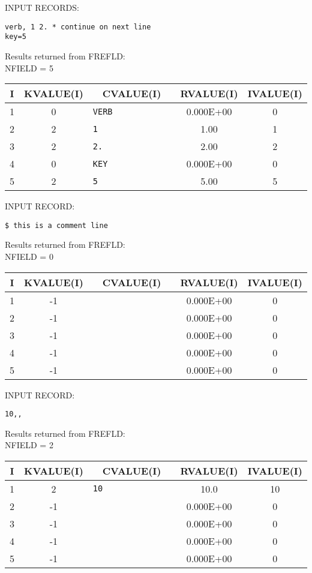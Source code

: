 INPUT RECORDS:\\
\begin{verbatim}
verb, 1 2. * continue on next line
key=5
\end{verbatim}

Results returned from FREFLD:\\
NFIELD = 5

\begin{tabular}{|ccccc|} \hline \hline
I    &  KVALUE(I) &       CVALUE(I)  &        RVALUE(I)   &  IVALUE(I)\\\hline
   1   &      0 &\verb*"VERB            " & 0.000E+00 & 0\\
   2   &      2 &\verb*"1               " & 1.00     & 1\\
   3   &      2 &\verb*"2.              " & 2.00     & 2\\
   4   &      0 &\verb*"KEY             " & 0.000E+00 & 0\\
   5   &      2 &\verb*"5               " & 5.00     & 5\\ \hline \hline
\end{tabular}

INPUT RECORD:
\begin{verbatim}
$ this is a comment line
\end{verbatim}

Results returned from FREFLD:\\
NFIELD = 0

\begin{tabular}{|ccccc|} \hline \hline
I    &  KVALUE(I)  &      CVALUE(I)    &     RVALUE(I) &    IVALUE(I)\\\hline
1 &-1 &\verb*"                "  &    0.000E+00 & 0\\
2 &-1 &\verb*"                "  &    0.000E+00 & 0\\
3 &-1 &\verb*"                "  &    0.000E+00 & 0\\
4 &-1 &\verb*"                "  &    0.000E+00 & 0\\
5 &-1 &\verb*"                "  &    0.000E+00 & 0\\ \hline \hline
\end{tabular}

INPUT RECORD:
\begin{verbatim}
10,,
\end{verbatim}

Results returned from FREFLD:\\
NFIELD =    2

\begin{tabular}{|ccccc|} \hline \hline
I    &  KVALUE(I) &       CVALUE(I)       &   RVALUE(I)   &  IVALUE(I)\\\hline
1  &  2  &\verb*"10              "  &     10.0     &  10\\
2  & -1  &\verb*"                "  &    0.000E+00 &  0\\
3  & -1  &\verb*"                "  &    0.000E+00 &  0\\
4  & -1  &\verb*"                "  &    0.000E+00 &  0\\
5  & -1  &\verb*"                "  &    0.000E+00 &  0\\ \hline \hline
\end{tabular}

